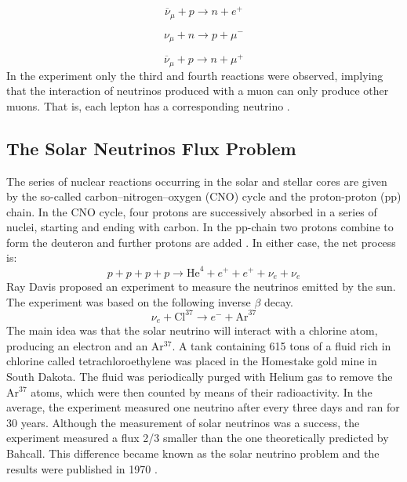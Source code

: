 \begin{equation}
	\overline{\nu}_{\mu} + p \longrightarrow n + e^+
	\label{lss_segunda}
\end{equation}

\begin{equation}
	\nu_{\mu} + n \longrightarrow p + \mu^-
	\label{lss_terceira}
\end{equation}
 
\begin{equation}
	\overline{\nu}_{\mu} + p \longrightarrow n + \mu^+
	\label{lss_quarta}
\end{equation}
%
In the experiment only the third and fourth reactions were observed, implying that the interaction of neutrinos produced with a muon can only produce other muons. That is, each lepton has a corresponding neutrino \cite{two_neutrinos}.
%
\subsection{The Solar Neutrinos Flux Problem}
The series of nuclear reactions occurring in the solar and stellar cores are given by the so-called carbon–nitrogen–oxygen (CNO) cycle and the proton-proton (pp) chain. In the CNO cycle, four protons are successively absorbed in a series of nuclei, starting and ending with carbon. In the pp-chain two protons combine to form the deuteron and further protons are added \cite{the_story_of_the_neutrino}. In either case, the net process is:
%
\begin{equation}
	p+p+p+p \longrightarrow \textrm{He}^4 +e^+ + e^+ +\nu_e +\nu_e
	\label{solar_reaction}
\end{equation}
%
Ray Davis proposed an experiment to measure the neutrinos emitted by the sun. The experiment was based on the following inverse $\beta$ decay.
%
\begin{equation}
		\nu_e + \textrm{Cl}^{37} \longrightarrow e^- +\textrm{Ar}^{37}
		\label{solar_reaction}
\end{equation}
%
The main idea was that the solar neutrino will interact with a chlorine atom, producing an electron and an Ar$^{37}$. A tank containing 615 tons of a fluid rich in chlorine called tetrachloroethylene was placed in the Homestake gold mine in South Dakota. The fluid was periodically purged with Helium gas to remove the Ar$^{37}$ atoms, which were then counted by means of their radioactivity. In the average, the experiment measured one neutrino after every three days and ran for 30 years. Although the measurement of solar neutrinos was a success, the experiment measured a flux 2/3 smaller than the one theoretically predicted by Bahcall. This difference became known as the solar neutrino problem and the results were published in 1970 \cite{the_story_of_the_neutrino}.
%

